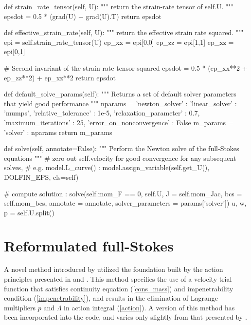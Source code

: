 \begin{python}[label=cslvr_plane_strain, caption={\CSLVR source code contained in the \texttt{MomentumDukowiczPlaneStrain} class.}]
def strain_rate_tensor(self, U):
  """
  return the strain-rate tensor of self.U.
  """
  epsdot = 0.5 * (grad(U) + grad(U).T)
  return epsdot

def effective_strain_rate(self, U):
  """
  return the effective strain rate squared.
  """
  epi    = self.strain_rate_tensor(U)
  ep_xx  = epi[0,0]
  ep_zz  = epi[1,1]
  ep_xz  = epi[0,1]
  
  # Second invariant of the strain rate tensor squared
  epsdot = 0.5 * (ep_xx**2 + ep_zz**2) + ep_xz**2
  return epsdot

def default_solve_params(self):
  """ 
  Returns a set of default solver parameters that yield good performance
  """
  nparams = {'newton_solver' : {'linear_solver'            : 'mumps',
                                'relative_tolerance'       : 1e-5,
                                'relaxation_parameter'     : 0.7,
                                'maximum_iterations'       : 25,
                                'error_on_nonconvergence'  : False}}
  m_params  = {'solver'      : nparams}
  return m_params

def solve(self, annotate=False):
  """ 
  Perform the Newton solve of the full-Stokes equations 
  """
  # zero out self.velocity for good convergence for any subsequent solves,
  # e.g. model.L_curve() :
  model.assign_variable(self.get_U(), DOLFIN_EPS, cls=self)
  
  # compute solution :
  solve(self.mom_F == 0, self.U, J = self.mom_Jac, bcs = self.mom_bcs,
        annotate = annotate, solver_parameters = params['solver'])
  u, w, p = self.U.split()
\end{python}

\section{Reformulated full-Stokes} \label{ssn_reformulated_stokes}

A novel method introduced by \citet{dukowicz_2012} utilized the foundation built by the action principles presented in \citet{dukowicz_2010} and \citet{dukowicz_2011}.  This method specifies the use of a velocity trial function that satisfies continuity equation (\ref{cons_mass}) and impenetrability condition (\ref{impenetrability}), and results in the elimination of Lagrange multipliers $p$ and $\Lambda$ in action integral (\ref{action}).  A version of this method has been incorporated into the \CSLVR code, and varies only slightly from that presented by \citet{dukowicz_2012}.

